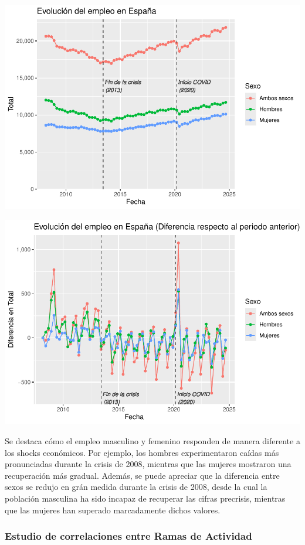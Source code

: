 \documentclass[notspecified,article,submit,moreauthors,pdftex]{Definitions/mdpi}
\begin{document}
\includegraphics{ProyectoAED2024_files/figure-latex/unnamed-chunk-39-1.pdf}

\includegraphics{ProyectoAED2024_files/figure-latex/unnamed-chunk-40-1.pdf}

Se destaca cómo el empleo masculino y femenino responden de manera
diferente a los shocks económicos. Por ejemplo, los hombres
experimentaron caídas más pronunciadas durante la crisis de 2008,
mientras que las mujeres mostraron una recuperación más gradual. Además,
se puede apreciar que la diferencia entre sexos se redujo en grán medida
durante la crisis de 2008, desde la cual la población masculina ha sido
incapaz de recuperar las cifras precrisis, mientras que las mujeres han
superado marcadamente dichos valores.

\subsubsection{Estudio de correlaciones entre Ramas de
Actividad}\label{estudio-de-correlaciones-entre-ramas-de-actividad}
\end{document}
